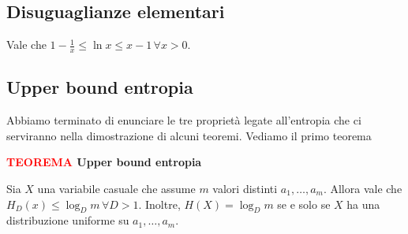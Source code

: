 \documentclass[12pt]{report}
\begin{document}
    \subsection{Disuguaglianze elementari}

    Vale che $1-\frac{1}{x} \leq \ln{x} \leq x-1\, \forall x > 0$.

    \vspace{10px}


    \subsection{Upper bound entropia}

    Abbiamo terminato di enunciare le tre proprietà legate all'entropia che ci serviranno nella dimostrazione di alcuni teoremi.
    Vediamo il primo teorema

    \vspace{5px}
    \begin{tcolorbox}
        \textbf{\textcolor{red}{TEOREMA} Upper bound entropia }
        \vspace{5px}
        \begin{center}
            Sia $X$ una variabile casuale che assume $m$ valori distinti $a_1,\dots,a_m$. Allora vale che $H_D(x) \leq \log_D{m}\, \forall D > 1$. Inoltre, $H(X) = \log_D{m}$ se e solo se $X$ ha una distribuzione uniforme su $a_1,\dots,a_m$.
        \end{center}
    \end{tcolorbox}
\end{document}
